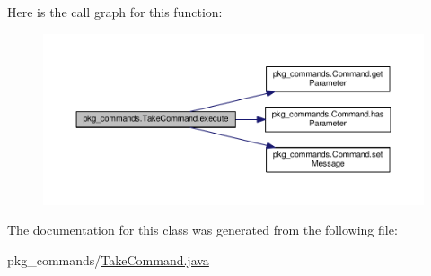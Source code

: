 Here is the call graph for this function\-:
\nopagebreak
\begin{figure}[H]
\begin{center}
\leavevmode
\includegraphics[width=350pt]{classpkg__commands_1_1TakeCommand_a17789062aaf2ab5747c7eeac118875cd_cgraph}
\end{center}
\end{figure}




The documentation for this class was generated from the following file\-:\begin{DoxyCompactItemize}
\item 
pkg\-\_\-commands/\hyperlink{TakeCommand_8java}{Take\-Command.\-java}\end{DoxyCompactItemize}
